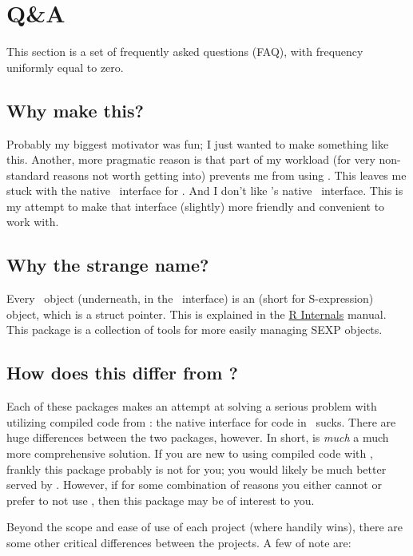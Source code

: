 \section{Q\&A}

This section is a set of frequently asked questions (FAQ), with frequency uniformly
equal to zero.


\subsection{Why make this?}

Probably my biggest motivator was fun; I just wanted to make something like this.  Another,
more pragmatic reason is that part of my workload (for very non-standard reasons not worth 
getting into) prevents me from using .  This leaves me stuck with the native \C\ 
interface for \R.  And I don't like \R's native \C\ interface.  This is my attempt to 
make that interface (slightly) more friendly and convenient to work with.


\subsection{Why the strange name?}

Every \R\ object (underneath, in the \C\ interface) is an  (short for
S-expression) object, which is a struct pointer.  This is explained in the
\href{http://cran.r-project.org/doc/manuals/R-ints.html#SEXPs}{R Internals} 
manual.  This package is a collection of tools for more easily managing SEXP 
objects.


\subsection{How does this differ from ?}
Each of these packages makes an attempt at solving a serious problem with utilizing compiled
code from \R: the native interface for \proglang{C} code in \R\ sucks.  There are huge 
differences between the two packages, however. In short, \pkg{Rcpp} is \emph{much} a much 
more comprehensive solution.  If you are new to using compiled code with \R, frankly this 
package probably is not for you; you would likely be much better served by .  
However, if for some combination of reasons you either cannot or prefer to not use 
\pkg{Rcpp}, then this package may be of interest to you.

Beyond the scope and ease of use of each project (where  handily wins), there are
some other critical differences between the projects.  A few of note are:

